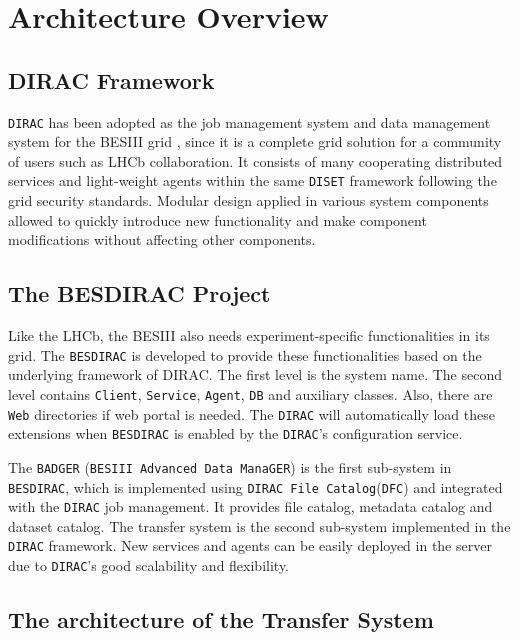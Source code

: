 \section{Architecture Overview}

\subsection{DIRAC Framework}

{\tt DIRAC} \cite{bib:dirac3,bib:diracgit} 
has been adopted as the job management system and data management
system for the BESIII grid \cite{bib:besdfc}, since 
it is a complete grid solution for a community of users such as
LHCb collaboration.
It consists of many cooperating distributed services and light-weight
agents within the same {\tt DISET} framework following the grid
security standards.
Modular design applied in various system components allowed to quickly
introduce new functionality and make component modifications without
affecting other components.

\subsection{The BESDIRAC Project}

Like the LHCb, the BESIII also needs experiment-specific 
functionalities in its grid.
The {\tt BESDIRAC} \cite{bib:besdirac} 
is developed to provide these functionalities
based on the underlying framework of DIRAC.
The first level is the system name. The second level contains
{\tt Client}, {\tt Service}, {\tt Agent}, {\tt DB} and auxiliary classes.
Also, there are {\tt Web} directories if web portal is needed.
The {\tt DIRAC} will automatically load these extensions when 
{\tt BESDIRAC} is enabled by the {\tt DIRAC}'s configuration service.

The {\tt BADGER} (\verb"BESIII Advanced Data ManaGER") is the first sub-system
in {\tt BESDIRAC}, which is implemented using {\tt DIRAC File
Catalog}(\verb"DFC")
and integrated with the {\tt DIRAC} job management.
It provides file catalog, metadata catalog and dataset catalog.
%
The transfer system is the second sub-system implemented in the
{\tt DIRAC} framework. 
New services and agents can be easily deployed in the server
due to {\tt DIRAC}'s good scalability and flexibility.

\subsection{The architecture of the Transfer System}

